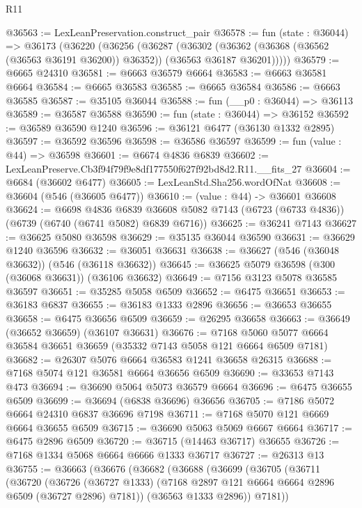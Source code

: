 \begin{lexlean}{R11}
\begin{coremodule}
@36563 := LexLeanPreservation.construct_pair
@36578 := fun (state : @36044) =>
  @36173
    (@36220
      (@36256
        (@36287
          (@36302
            (@36362 (@36368 (@36562 (@36563 @36191 @36200)) @36352))
            (@36563 @36187 @36201)))))
@36579 := @6665 @24310
@36581 := @6663 @36579 @6664
@36583 := @6663 @36581 @6664
@36584 := @6665 @36583
@36585 := @6665 @36584
@36586 := @6663 @36585
@36587 := @35105 @36044
@36588 := fun (__p0 : @36044) => @36113
@36589 := @36587 @36588
@36590 := fun (state : @36044) => @36152
@36592 := @36589 @36590 @1240
@36596 := @36121 @6477 (@36130 @1332 @2895)
@36597 := @36592 @36596
@36598 := @36586 @36597
@36599 := fun (value : @44) => @36598
@36601 := @6674 @4836 @6839
@36602 := LexLeanPreserve.Cb3f94f79f9e8df177550f627f92bd8d2.R11.__fits_27
@36604 := @6684 (@36602 @6477)
@36605 := LexLeanStd.Sha256.wordOfNat
@36608 := @36604 (@546 (@36605 @6477))
@36610 := (value : @44) -> @36601 @36608
@36624 := @6698
    @4836
    @6839
    @36608
    @5082
    @7143
    (@6723 (@6733 @4836))
    (@6739 (@6740 (@6741 @5082) @6839 @6716))
@36625 := @36241 @7143
@36627 := @36625 @5080 @36598
@36629 := @35135 @36044 @36590
@36631 := @36629 @1240 @36596
@36632 := @36051 @36631
@36638 := @36627 (@546 (@36048 @36632)) (@546 (@36118 @36632))
@36645 := @36625 @5079 @36598 (@300 (@36068 @36631)) (@36106 @36632)
@36649 := @7156 @3123 @5078 @36585 @36597
@36651 := @35285 @5058 @6509
@36652 := @6475 @36651
@36653 := @36183 @6837
@36655 := @36183 @1333 @2896
@36656 := @36653 @36655
@36658 := @6475 @36656 @6509
@36659 := @26295 @36658
@36663 := @36649 (@36652 @36659) (@36107 @36631)
@36676 := @7168 @5060 @5077 @6664 @36584 @36651 @36659 (@35332 @7143 @5058 @121 @6664 @6509 @7181)
@36682 := @26307 @5076 @6664 @36583 @1241 @36658 @26315
@36688 := @7168 @5074 @121 @36581 @6664 @36656 @6509
@36690 := @33653 @7143 @473
@36694 := @36690 @5064 @5073 @36579 @6664
@36696 := @6475 @36655 @6509
@36699 := @36694 (@6838 @36696) @36656
@36705 := @7186 @5072 @6664 @24310 @6837 @36696 @7198
@36711 := @7168 @5070 @121 @6669 @6664 @36655 @6509
@36715 := @36690 @5063 @5069 @6667 @6664
@36717 := @6475 @2896 @6509
@36720 := @36715 (@14463 @36717) @36655
@36726 := @7168 @1334 @5068 @6664 @6666 @1333 @36717
@36727 := @26313 @13
@36755 := @36663
    (@36676
      (@36682
        (@36688
          (@36699
            (@36705
              (@36711
                (@36720
                  (@36726
                    (@36727 @1333)
                    (@7168 @2897 @121 @6664 @6664 @2896 @6509 (@36727 @2896) @7181))
                  (@36563 @1333 @2896))
                @7181))

\end{coremodule}
\end{lexlean}
